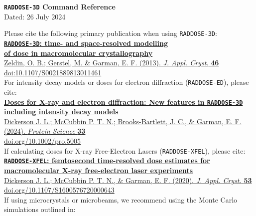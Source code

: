 \documentclass[a4paper]{article}
\newcommand{\RD}{\texttt{RADDOSE-3D}\xspace}
\newcommand{\RE}{\texttt{RADDOSE-ED}\xspace}
\newcommand{\RX}{\texttt{RADDOSE-XFEL}\xspace}
\begin{document}
\begin{center}
\noindent \textsf{\huge\textbf{\RD Command Reference}}\\[0.3em]
Dated: 26 July 2024\\[3.5em]
\end{center}

\noindent
Please cite the following primary publication when using \RD:\\[0.4em]
\href{http://dx.doi.org/10.1107/S0021889813011461}{\large\textbf{\RD: time- and space-resolved modelling\\[0.0em] of dose in macromolecular crystallography}}\\[0.1em]
\href{http://dx.doi.org/10.1107/S0021889813011461}{Zeldin, O. B.; Gerstel, M. \& Garman, E. F. (2013). \textit{J. Appl. Cryst.} \textbf{46} %
}\\[0.1em]
\href{http://dx.doi.org/10.1107/S0021889813011461}{doi:10.1107/S0021889813011461}
\\[1.5em]
\noindent
For intensity decay models or doses for electron diffraction (\RE), please cite:\\[0.4em]
\href{https://doi.org/10.1002/pro.5005}{\large\textbf{Doses for X-ray and electron diffraction: New features in \RD including intensity decay models}}\\[0.1em]
\href{https://doi.org/10.1002/pro.5005}{Dickerson J. L.; McCubbin P. T. N.; Brooks-Bartlett, J. C., \& Garman, E. F. (2024). \textit{Protein Science} \textbf{33} %
}\\[0.1em]
\href{https://doi.org/10.1002/pro.5005}{doi.org/10.1002/pro.5005}
\\[1.5em]
\noindent
If calculating doses for X-ray Free-Electron Lasers (\RX), please cite:\\[0.4em]
\href{https://doi.org/10.1107/S1600576720000643}{\large\textbf{\RX: femtosecond time-resolved dose estimates for macromolecular X-ray free-electron laser experiments}}\\[0.1em]
\href{https://doi.org/10.1107/S1600576720000643}{Dickerson J. L.; McCubbin P. T. N., \& Garman, E. F. (2020). \textit{J. Appl. Cryst.} \textbf{53} %
}\\[0.1em]
\href{https://doi.org/10.1107/S1600576720000643}{doi.org/10.1107/S1600576720000643}
\\[1.5em]
\noindent
If using microcrystals or microbeams, we recommend using the Monte Carlo simulations outlined in:\\[0.4em]
\end{document}

